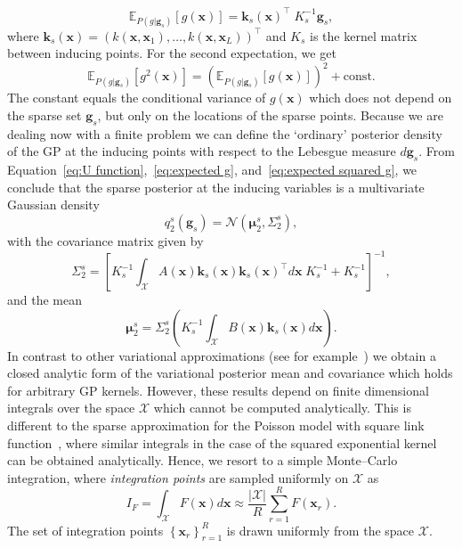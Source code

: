 \documentclass[twoside,11pt]{article}
\newcommand{\EE}[2]{\mathbb{E}_{#1}\left[ #2 \right]}
\newcommand{\set}[1]{\left\lbrace #1 \right\rbrace}
\newcommand{\bs}[1]{\boldsymbol{#1}}
\newcommand{\bx}{\boldsymbol{x}}
\newcommand{\bg}{\boldsymbol{g}}
\newcommand{\bks}{\boldsymbol{k}_s}
\newcommand{\X}{\mathcal{X}}
\begin{document}
\begin{equation}\label{eq:expected g}
\EE{P(g\vert\bg_s)}{g(\bx)} = \boldsymbol{k}_s(\bx)^\top\; K_s^{-1}\boldsymbol{g}_s,
\end{equation}
where $\bks(\bx)=(k(\bx,\bx_1),\ldots,k(\bx,\bx_L))^\top$ and $K_s$ is the kernel matrix between inducing points.
For the second expectation, we get 
\begin{equation}\label{eq:expected squared g}
\EE{P(g\vert\bg_s)}{g^2(\bx)} = \left(\EE{P(g\vert\bg_s)}{g(\bx)}\right)^2 + \mbox{const.}
\end{equation}
The constant equals the conditional variance of $g(\bx)$ which does not depend on the sparse set $\bs{g}_s$, 
but only on the locations of the sparse points. Because we are dealing now with a finite problem we can define the `ordinary' posterior density of the GP at the inducing points
with respect to the Lebesgue measure $d\bg_s$. From Equation~\eqref{eq:U function},~\eqref{eq:expected g}, and~\eqref{eq:expected squared g}, we conclude that the sparse posterior at the inducing variables is a multivariate Gaussian density
\begin{equation}\label{eq:GP posterior}
q_2^{s}(\bs{g}_s) = \mathcal{N}(\bs{\mu}_2^s,\Sigma_2^s),
\end{equation}
with the covariance matrix given by 
\begin{equation}\label{eq:posterior GP cov}
\Sigma_2^s = \left[K_s^{-1}\int_{\X} A(\bx)\bs{k}_s(\bx)\bs{k}_s(\bx)^\top d\bx\; K_s^{-1} + K_s^{-1}\right]^{-1},
\end{equation}
and the mean
\begin{equation}\label{eq:posterior GP mean}
\boldsymbol{\mu}_2^s = \Sigma_2^s\left(K_s^{-1}\int_{\X} B(\bx)\bs{k}_s(\bx)d\bx\right).
\end{equation}
In contrast to other variational approximations (see for example~\citep{lloyd2015variational,hensman2015mcmc})
we obtain a closed analytic form of the variational posterior mean and covariance which holds for
arbitrary GP kernels. However, these results depend on finite dimensional integrals over the space $\X$
which cannot be computed analytically. This is different to the sparse approximation
for the Poisson model with square link function~\citep{lloyd2015variational}, where similar integrals in the case of the squared exponential kernel can be obtained analytically. Hence, 
we resort to a simple Monte--Carlo integration, where {\it integration points} are sampled uniformly on $\X$ as
\begin{equation}
I_F = \int_\X F(\bx) d\bx \approx \frac{|\X|}{R}\sum_{r=1}^R F(\bx_r).
\end{equation}
The set of integration points $\set{\bx_r}_{r=1}^R$ is drawn uniformly from the space $\X$.
\end{document}
